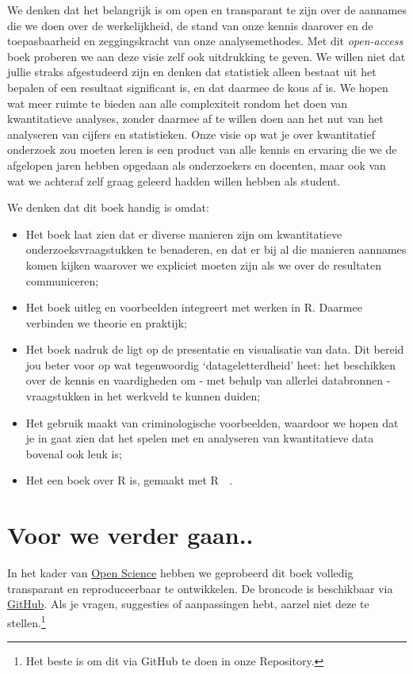 \documentclass[
  letterpaper,
  DIV=11,
  numbers=noendperiod]{scrreprt}
\providecommand{\tightlist}{%
  \setlength{\itemsep}{0pt}\setlength{\parskip}{0pt}}
\begin{document}
We denken dat het belangrijk is om open en transparant te zijn over de
aannames die we doen over de werkelijkheid, de stand van onze kennis
daarover en de toepasbaarheid en zeggingskracht van onze
analysemethodes. Met dit \emph{open-access} boek proberen we aan deze
visie zelf ook uitdrukking te geven. We willen niet dat jullie straks
afgestudeerd zijn en denken dat statistiek alleen bestaat uit het
bepalen of een resultaat significant is, en dat daarmee de kous af is.
We hopen wat meer ruimte te bieden aan alle complexiteit rondom het doen
van kwantitatieve analyses, zonder daarmee af te willen doen aan het nut
van het analyseren van cijfers en statistieken. Onze visie op wat je
over kwantitatief onderzoek zou moeten leren is een product van alle
kennis en ervaring die we de afgelopen jaren hebben opgedaan als
onderzoekers en docenten, maar ook van wat we achteraf zelf graag
geleerd hadden willen hebben als student.

We denken dat dit boek handig is omdat:

\begin{itemize}
\tightlist
\item
  Het boek laat zien dat er diverse manieren zijn om kwantitatieve
  onderzoeksvraagstukken te benaderen, en dat er bij al die manieren
  aannames komen kijken waarover we expliciet moeten zijn als we over de
  resultaten communiceren;
\item
  Het boek uitleg en voorbeelden integreert met werken in R. Daarmee
  verbinden we theorie en praktijk;
\item
  Het boek nadruk de ligt op de presentatie en visualisatie van data.
  Dit bereid jou beter voor op wat tegenwoordig `datageletterdheid'
  heet: het beschikken over de kennis en vaardigheden om - met behulp
  van allerlei databronnen - vraagstukken in het werkveld te kunnen
  duiden;
\item
  Het gebruik maakt van criminologische voorbeelden, waardoor we hopen
  dat je in gaat zien dat het spelen met en analyseren van kwantitatieve
  data bovenal ook leuk is;
\item
  Het een boek over R is, gemaakt met R 🤯 .
\end{itemize}

\section{Voor we verder gaan..}\label{voor-we-verder-gaan..}

In het kader van
\href{https://www.knaw.nl/over-de-instituten/open-science}{Open Science}
hebben we geprobeerd dit boek volledig transparant en reproduceerbaar te
ontwikkelen. De broncode is beschikbaar via
\href{https://github.com/joostjansen/quantcrim}{GitHub}. Als je vragen,
suggesties of aanpassingen hebt, aarzel niet deze te stellen.\footnote{Het
  beste is om dit via GitHub te doen in onze Repository.}
\end{document}
